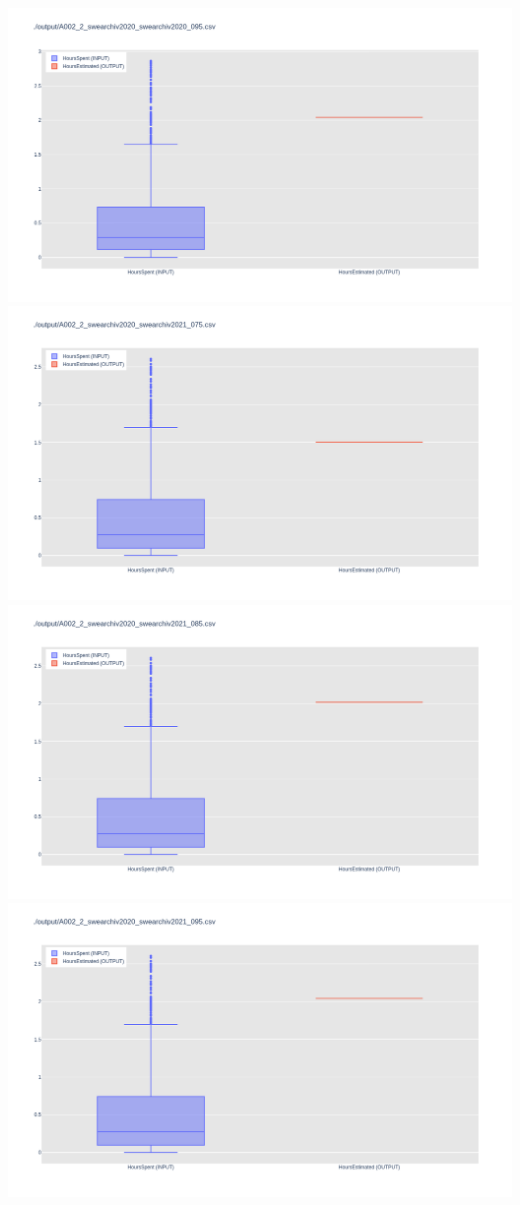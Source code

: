 \includegraphics[width=\textwidth]{Scripts/output/A002_2_swearchiv2020_swearchiv2020_095.csv.png}
\includegraphics[width=\textwidth]{Scripts/output/A002_2_swearchiv2020_swearchiv2021_075.csv.png}
\includegraphics[width=\textwidth]{Scripts/output/A002_2_swearchiv2020_swearchiv2021_085.csv.png}
\includegraphics[width=\textwidth]{Scripts/output/A002_2_swearchiv2020_swearchiv2021_095.csv.png}
